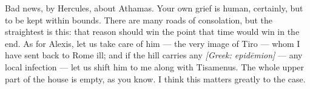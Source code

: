 

 Bad news, by Hercules, about Athamas. Your own grief is human, certainly, but to be kept within bounds. There are many roads of consolation, but the straightest is this: that reason should win the point that time would win in the end. As for Alexis, let us take care of him --- the very image of Tiro --- whom I have sent back to Rome ill; and if the hill carries any \textit{[Greek: epid\=emion]} --- any local infection --- let us shift him to me along with \dag Tisamenus\dag. The whole upper part of the house is empty, as you know. I think this matters greatly to the case.
